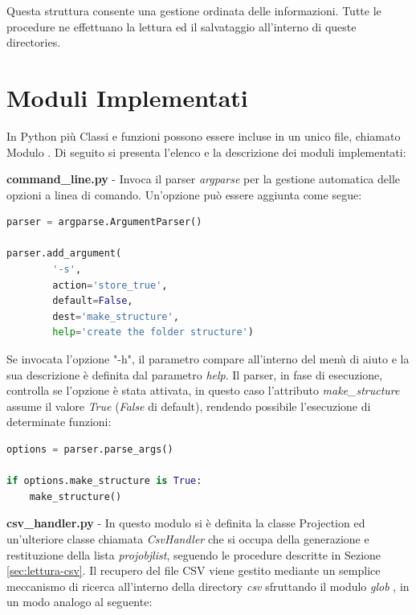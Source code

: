 \documentclass[a4paper,12pt, doubleside]{report}
\begin{document}
                Questa struttura consente una gestione ordinata delle informazioni. Tutte le procedure ne effettuano la lettura ed il salvataggio all'interno di queste directories.
                
        \section{Moduli Implementati}
            \par
                In Python più Classi e funzioni possono essere incluse in un unico file, chiamato Modulo \cite{python-modules}. Di seguito si presenta l'elenco e la descrizione dei moduli implementati:
            
            \bigskip
            \par
                \textbf{command\_line.py} - Invoca il parser \textit{argparse} per la gestione automatica delle opzioni a linea di comando. Un'opzione può essere aggiunta come segue:
                
                \begin{lstlisting}[language=python, frame=bt]
parser = argparse.ArgumentParser()

parser.add_argument(
        '-s', 
        action='store_true', 
        default=False,
        dest='make_structure',
        help='create the folder structure')
                \end{lstlisting}
                
                Se invocata l'opzione "-h", il parametro compare all'interno del menù di aiuto e la sua descrizione è definita dal parametro \textit{help}. Il parser, in fase di esecuzione, controlla se l'opzione è stata attivata, in questo caso l'attributo \textit{make\_structure} assume il valore \textit{True} (\textit{False} di default), rendendo possibile l'esecuzione di determinate funzioni:
                
                \begin{lstlisting}[language=python, frame=bt]
options = parser.parse_args()
                
if options.make_structure is True:
    make_structure()
                \end{lstlisting}
               
            \bigskip
            \par
                \textbf{csv\_handler.py} - In questo modulo si è definita la classe Projection ed un'ulteriore classe chiamata \textit{CsvHandler} che si occupa della generazione e restituzione della lista \textit{proj\textunderscore obj\textunderscore list}, seguendo le procedure descritte in Sezione \ref{sec:lettura-csv}. Il recupero del file CSV viene gestito mediante un semplice meccanismo di ricerca all'interno della directory \textit{csv} sfruttando il modulo \textit{glob} \cite{python-glob}, in un modo analogo al seguente:
                
\end{document}
